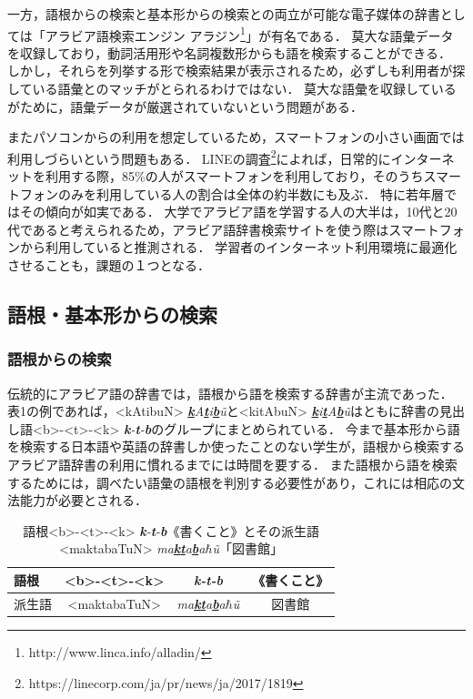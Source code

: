 \documentclass[technicalreport]{ieicej}
\begin{document}
一方，語根からの検索と基本形からの検索との両立が可能な電子媒体の辞書としては「アラビア語検索エンジン アラジン\footnote{http://www.linca.info/alladin/}」が有名である．
莫大な語彙データを収録しており，動詞活用形や名詞複数形からも語を検索することができる．
しかし，それらを列挙する形で検索結果が表示されるため，必ずしも利用者が探している語彙とのマッチがとられるわけではない．
莫大な語彙を収録しているがために，語彙データが厳選されていないという問題がある．

またパソコンからの利用を想定しているため，スマートフォンの小さい画面では利用しづらいという問題もある．
LINEの調査\footnote{https://linecorp.com/ja/pr/news/ja/2017/1819}によれば，日常的にインターネットを利用する際，85\%の人がスマートフォンを利用しており，そのうちスマートフォンのみを利用している人の割合は全体の約半数にも及ぶ．
特に若年層ではその傾向が如実である．
大学でアラビア語を学習する人の大半は，10代と20代であると考えられるため，アラビア語辞書検索サイトを使う際はスマートフォンから利用していると推測される．
学習者のインターネット利用環境に最適化させることも，課題の１つとなる．

\subsection{語根・基本形からの検索}
\subsubsection{語根からの検索}
伝統的にアラビア語の辞書では，語根から語を検索する辞書が主流であった．
表1の例であれば，<kAtibuN> \textit{\underline{\textbf{k}}A\underline{\textbf{t}}i\underline{\textbf{b}}\~u}と<kitAbuN> \textit{\underline{\textbf{k}}i\underline{\textbf{t}}A\underline{\textbf{b}}\~u}はともに辞書の見出し語<b>-<t>-<k> \textit{\textbf{k}-\textbf{t}-\textbf{b}}のグループにまとめられている．
今まで基本形から語を検索する日本語や英語の辞書しか使ったことのない学生が，語根から検索するアラビア語辞書の利用に慣れるまでには時間を要する．
また語根から語を検索するためには，調べたい語彙の語根を判別する必要性があり，これには相応の文法能力が必要とされる．

\begin{table}[ht]
\begin{center}
\begin{tabular}{l|ccc}
   語根 & <b>-<t>-<k> &\textit{\textbf{k}-\textbf{t}-\textbf{b}}& 《書くこと》\\
  \hline
 派生語 & <maktabaTuN>&\textit{ma\underline{\textbf{k}}\underline{\textbf{t}}a\underline{\textbf{b}}a$\hbar$\~u} & 図書館\\
\hline
\end{tabular}
\caption{語根<b>-<t>-<k> \textit{\textbf{k}-\textbf{t}-\textbf{b}}《書くこと》とその派生語<maktabaTuN> \textit{ma\underline{\textbf{k}}\underline{\textbf{t}}a\underline{\textbf{b}}a$\hbar$\~u}「図書館」}
\label{table:alignment}
\end{center}
\end{table}
\end{document}
